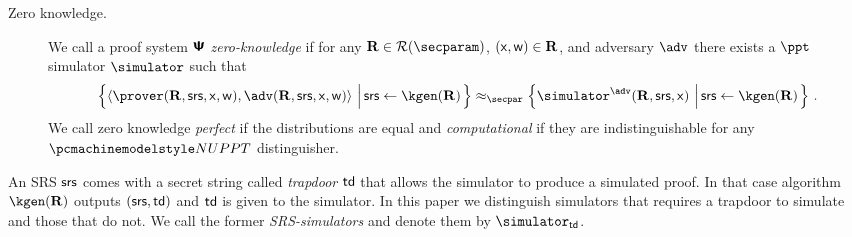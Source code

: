 \documentclass[runningheads,11pt]{llncs}
\begin{document}

\begin{description}
  \item[Zero knowledge.]
 We call a proof system $\bm{\mathsf{\Psi}}$ \emph{zero-knowledge} if for any
 $\REL \in \RELGEN(\secparam)$, $(\mathsf{x}, \mathsf{w}) \in \mathbf{R}$, and adversary $\adv$
 there exists a $\ppt$ simulator $\simulator$ such that
	\begin{multline*}
	  \left\{\ip{\prover(\REL, \srs, \inp, \wit)}{\adv(\REL, \srs, \inp, \wit)}
      \,\left|\, \srs \gets \kgen(\REL)\vphantom{\simulator^\adv}\right.\right\} \approx_\secpar
		\left\{\simulator^{\adv}(\REL, \srs, \inp)\,\left|\, \srs \gets
        \kgen(\REL)\COMMENT{, (\inp, \wit) \gets \adv(\REL,
          \srs)}\vphantom{\simulator^\adv}\right.\right\}\,.
\end{multline*}
We call zero knowledge \emph{perfect} if the distributions are equal and
\emph{computational} if they are indistinguishable for any $\nuppt$
distinguisher.

\end{description}
An SRS $\mathsf{srs}$ comes with a secret string called \emph{trapdoor} $\mathsf{td}$ that
allows the simulator to produce a simulated proof. In that case algorithm
$\kgen(\REL)$ outputs $(\mathsf{srs}, \mathsf{td})$ and $\mathsf{td}$ is given to the simulator. In this
paper we distinguish simulators that requires a trapdoor to simulate and those
that do not. We call the former \emph{SRS-simulators} and denote them by
$\simulator_\td$.

\end{document}
